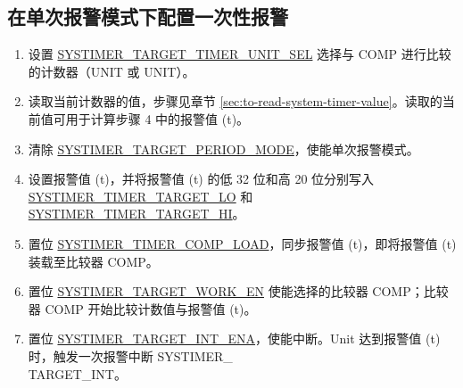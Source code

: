 \documentclass[main\_\_CN.tex]{subfiles}
\begin{document}
\subsection{在单次报警模式下配置一次性报警}
\begin{enumerate}
    \item 设置 \hyperref[fielddesc:SYSTIMERTARGET0TIMERUNITSEL]{SYSTIMER\_TARGET\_TIMER\_UNIT\_SEL} 选择与 COMP 进行比较的计数器（UNIT 或 UNIT）。
    \item 读取当前计数器的值，步骤见章节  \ref{sec:to-read-system-timer-value}。读取的当前值可用于计算步骤 4 中的报警值 (t)。
    \item 清除 \hyperref[fielddesc:SYSTIMERTARGET0PERIODMODE]{SYSTIMER\_TARGET\_PERIOD\_MODE}，使能单次报警模式。
    \item 设置报警值 (t)，并将报警值 (t) 的低 32 位和高 20 位分别写入   \hyperref[fielddesc:SYSTIMERTIMERTARGET0LO]{SYSTIMER\_TIMER\_TARGET\_LO} 和 \hyperref[fielddesc:SYSTIMERTIMERTARGET0HI]{SYSTIMER\_TIMER\_TARGET\_HI}。
    \item 置位 \hyperref[fielddesc:SYSTIMERTIMERCOMP0LOAD]{SYSTIMER\_TIMER\_COMP\_LOAD}，同步报警值 (t)，即将报警值 (t) 装载至比较器 COMP。
    \item 置位 \hyperref[fielddesc:SYSTIMERTARGET0WORKEN]{SYSTIMER\_TARGET\_WORK\_EN} 使能选择的比较器 COMP；比较器 COMP 开始比较计数值与报警值 (t)。
    \item 置位 \hyperref[fielddesc:SYSTIMERTARGET0INTENA]{SYSTIMER\_TARGET\_INT\_ENA}，使能中断。Unit 达到报警值 (t) 时，触发一次报警中断 SYSTIMER\_\\TARGET{}\_INT。
\end{enumerate}
\end{document}
